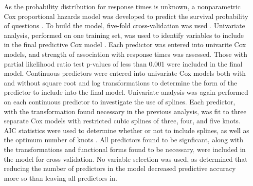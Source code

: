 \documentclass{article}
\begin{document}
As the probability distribution for response times is unknown, a nonparametric Cox proportional hazards model was developed to predict the survival probability of questions \cite{Moore2010}. To build the model, five-fold cross-validation was used \cite{Rodriguez2010}. Univariate analysis, performed on one training set, was used to identify variables to include in the final predictive Cox model \cite{Hammermeister1979}. Each predictor was entered into univarite Cox models, and strength of association with response times was assessed. Those with partial likelihood ratio test p-values of less than 0.001 were included in the final model. Continuous predictors were entered into univariate Cox models both with and without square root and log transformations to determine the form of the predictor to include into the final model. Univariate analysis was again performed on each continuous predictor to investigate the use of splines. Each predictor, with the transformation found necessary in the previous analysis, was fit to three separate Cox models with restricted cubic splines of three, four, and five knots. AIC statistics were used to determine whether or not to include splines, as well as the optimum number of knots \cite{Harrell2015}. All predictors found to be signficant, along with the transformations and functional forms found to be necessary, were included in the model for cross-validation. No variable selection was used, as \cite{Harrell2015} determined that reducing the number of predictors in the model decreased predictive accuracy more so than leaving all predictors in. 
\end{document}

